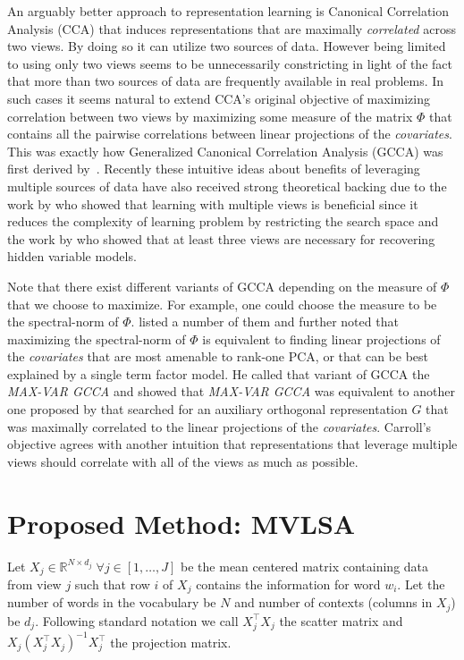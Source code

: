\documentclass[11pt]{article}
\begin{document}
An arguably better approach to representation
learning is Canonical Correlation
Analysis (CCA) that induces representations that are maximally
\emph{correlated} across two views. By doing so it can utilize two
sources of data. However being limited to using only two views seems
to be unnecessarily constricting in light of the fact that
more than two sources of data are frequently available in real
problems. In such cases it seems natural to extend CCA's original objective of maximizing
correlation between two views by maximizing some measure
of the matrix $\Phi$ that contains all the pairwise correlations between
linear projections of the \emph{covariates}. This was
exactly how Generalized Canonical Correlation Analysis (GCCA) was
first derived by~. Recently
these intuitive ideas about benefits of leveraging multiple sources of
data have also received strong theoretical backing
due to the work by  who showed that learning
with multiple views is beneficial since it reduces the complexity of
learning problem by restricting the search space and the work by
 who showed that at least three views
are necessary for recovering hidden variable models.

Note that there exist different variants of GCCA depending on the
measure of $\Phi$ that we choose to maximize. For example, one could choose the measure to be
the spectral-norm of $\Phi$. \cite{kettenring1971canonical} listed a
number of them and further noted that
maximizing the spectral-norm of $\Phi$ is equivalent to 
finding linear projections of the \emph{covariates} that are most
amenable to rank-one PCA, or that can be best explained by a single
term factor model. He called that variant of GCCA the 
\emph{MAX-VAR GCCA} and showed that \emph{MAX-VAR GCCA} was equivalent to another one proposed by
\cite{carroll1968generalization} that searched for an auxiliary orthogonal  
representation $G$ that was maximally correlated to the linear
projections of the \emph{covariates}.  Carroll's objective agrees with another
 intuition that representations 
that leverage multiple views should correlate with all of the views as much
as possible.

\section{Proposed Method: MVLSA}
\label{sec:gcca}
Let $X_j \in \mathbb{R}^{N\times d_j} \;
\forall j \in [1,\ldots,J]$ be the mean centered matrix containing
data from view $j$ such that row $i$ of $X_j$ contains the information for
word $w_i$. Let the number of words in the vocabulary be $N$
and number of contexts (columns in $X_j$) be $d_j$. %
Following standard
notation \cite{hastie2009elements} we call $X_j^\top X_j$ the scatter
matrix and $X_j (X_j^\top X_j)^{-1}X_j^\top$ the projection matrix.
\end{document}
